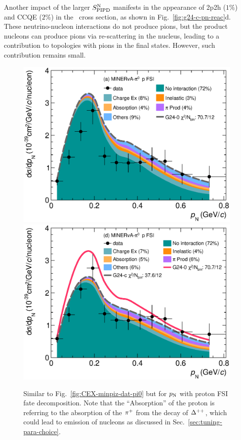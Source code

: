 Another impact of the larger $S_\textrm{PIPD}^\textrm{N}$ manifests in the appearance of 2p2h ($1\%$) and CCQE ($2\%$) in the \minpiz\ cross section, as shown in Fig.~\ref{fig:g24-c-pn-reac}d. These neutrino-nucleon interactions do not produce pions, but the product nucleons can produce pions via re-scattering in the nucleus, leading to a contribution to topologies with pions in the final states. However, such contribution remains small.

\begin{figure}[!htb] 	
    \centering 		
    \includegraphics[width=\dbfigwid\textwidth]{figures/tuning/0000-min_pi0_pn_pr_decomp_cex.eps}
    \includegraphics[width=\dbfigwid\textwidth]{figures/tuning/0026-min_pi0_pn_pr_decomp_covfix.eps}	
    \caption{\label{fig:minpiz-pn-pr} Similar to Fig.~\ref{fig:CEX-minpiz-dat-pi0} but for $p_\textrm{N}$ with proton FSI fate decomposition. Note that the ``Absorption'' of the proton is referring to the absorption of the $\pi^+$ from the decay of $\Delta^{++}$, which could lead to emission of nucleons as discussed in Sec.~\ref{sec:tuning-para-choice}.     
    } 
\end{figure}

